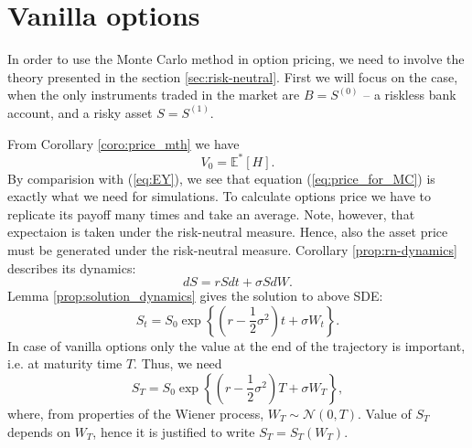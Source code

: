 \documentclass[a4paper,11pt, twoside]{book}
\theoremstyle{definition}
\theoremstyle{remark}
\def\Em{{\mathbb{E}^*}}
\begin{document}
\section{Vanilla options}
\label{sec:pricing_vanilla}

In order to use the Monte Carlo method in option pricing, we need to involve the theory presented in the section \ref{sec:risk-neutral}. First we will focus on the case, when the only instruments traded in the market are $B = S^{(0)}$ -- a riskless bank account, and a risky asset $S = S^{(1)}$.

From Corollary \ref{coro:price_mth} we have
\begin{equation}
 \label{eq:price_for_MC}
 V_0 = \Em[H].%
\end{equation}
By comparision with (\ref{eq:EY}), we see that equation (\ref{eq:price_for_MC}) is exactly what we need for simulations. To calculate options price we have to replicate its payoff many times and take an average. Note, however, that expectaion is taken under the risk-neutral measure. Hence, also the asset price must be generated under the risk-neutral measure. Corollary \ref{prop:rn-dynamics} describes its dynamics:
\[ dS = rSdt + \sigma S dW. \]
Lemma \ref{prop:solution_dynamics} gives the solution to above SDE:
\begin{equation}
 \label{eq:vanilla_St}
 S_t = S_0 \exp\left\{ (r - \frac{1}{2}\sigma^2)t + \sigma W_t \right\}.
\end{equation}
In case of vanilla options only the value at the end of the trajectory is important, i.e. at maturity time $T$. Thus, we need
\begin{equation}
\label{eq:vanilla_ST}
 S_T = S_0 \exp\left\{ (r - \frac{1}{2}\sigma^2)T + \sigma W_T \right\},
\end{equation}
where, from properties of the Wiener process, $W_T \sim \mathcal{N}(0,T)$. Value of $S_T$ depends on $W_T$, hence it is justified to write $S_T = S_T(W_T)$.
\end{document}
